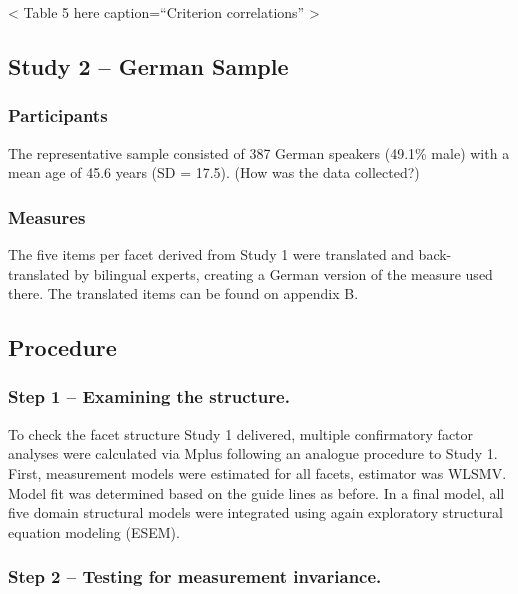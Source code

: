 \documentclass[,man,floatsintext]{apa6}
\theoremstyle{definition}
\theoremstyle{definition}
\theoremstyle{definition}
\theoremstyle{remark}
\begin{document}
\textless{} Table 5 here caption=\enquote{Criterion correlations}
\textgreater{}

\hypertarget{study-2-german-sample}{%
\subsection{Study 2 -- German Sample}\label{study-2-german-sample}}

\hypertarget{participants-1}{%
\subsubsection{Participants}\label{participants-1}}

The representative sample consisted of 387 German speakers (49.1\% male)
with a mean age of 45.6 years (SD = 17.5). (How was the data collected?)

\hypertarget{measures}{%
\subsubsection{Measures}\label{measures}}

The five items per facet derived from Study 1 were translated and
back-translated by bilingual experts, creating a German version of the
measure used there. The translated items can be found on appendix B.

\hypertarget{procedure-1}{%
\subsection{Procedure}\label{procedure-1}}

\hypertarget{step-1-examining-the-structure.}{%
\subsubsection{Step 1 -- Examining the
structure.}\label{step-1-examining-the-structure.}}

To check the facet structure Study 1 delivered, multiple confirmatory
factor analyses were calculated via Mplus following an analogue
procedure to Study 1. First, measurement models were estimated for all
facets, estimator was WLSMV. Model fit was determined based on the guide
lines as before. In a final model, all five domain structural models
were integrated using again exploratory structural equation modeling
(ESEM).

\hypertarget{step-2-testing-for-measurement-invariance.}{%
\subsubsection{Step 2 -- Testing for measurement
invariance.}\label{step-2-testing-for-measurement-invariance.}}
\end{document}
